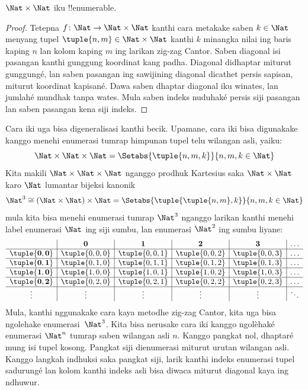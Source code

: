 \documentclass[../../../include/open-logic-section]{subfiles}
\begin{document}
\begin{prop}
$\Nat \times \Nat$ iku !!{enumerable}.
\end{prop}

\begin{proof}
Tetepna $f \colon \Nat \to \Nat\times\Nat$ kanthi cara metakake saben $k \in \Nat$
menyang tupel $\tuple{n,m} \in \Nat \times \Nat$ kanthi $k$ minangka nilai
ing baris kaping $n$ lan kolom kaping $m$ ing larikan zig-zag Cantor.
Saben diagonal isi pasangan kanthi gunggung koordinat kang padha.
Diagonal didhaptar miturut gunggungé, lan saben pasangan ing sawijining
diagonal dicathet persis sapisan, miturut koordinat kapisané.
Dawa saben dhaptar diagonal iku winates, lan jumlahé mundhak tanpa wates. Mula saben indeks
nuduhaké persis siji pasangan lan saben pasangan kena siji indeks.
\end{proof}

\begin{explain}
Cara iki uga bisa digeneralisasi kanthi becik. Upamane, cara iki bisa
digunakake kanggo menehi enumerasi tumrap himpunan tupel telu wilangan asli, yaiku:
\[
\Nat \times \Nat \times \Nat = \Setabs{\tuple{n,m,k}}{n,m,k \in \Nat}
\]
Kita makili $\Nat \times \Nat \times \Nat$ nganggo prodhuk
Kartesius saka $\Nat \times \Nat$ karo $\Nat$ lumantar bijeksi kanonik
\[
\Nat^3 \cong (\Nat \times \Nat) \times \Nat =
\Setabs{\tuple{\tuple{n,m},k}}{n, m, k
  \in \Nat }
\]
mula kita bisa menehi enumerasi tumrap $\Nat^3$ nganggo larikan kanthi menehi label
enumerasi $\Nat$ ing siji sumbu, lan enumerasi
$\Nat^2$ ing sumbu liyane:
\[
\begin{array}{ c | c | c | c | c | c}
& \mathbf 0 & \mathbf 1 & \mathbf 2 & \mathbf 3 & \dots \\
\hline
\mathbf{\tuple{0,0}} & \tuple{0,0,0} & \tuple{0,0,1} & \tuple{0,0,2} & \tuple{0,0,3} & \dots \\
\hline
\mathbf{\tuple{0,1}} & \tuple{0,1,0} & \tuple{0,1,1} & \tuple{0,1,2} & \tuple{0,1,3} & \dots \\
\hline
\mathbf{\tuple{1,0}} & \tuple{1,0,0} & \tuple{1,0,1} & \tuple{1,0,2} & \tuple{1,0,3} & \dots \\
\hline
\mathbf{\tuple{0,2}} & \tuple{0,2,0} & \tuple{0,2,1} & \tuple{0,2,2} & \tuple{0,2,3} & \dots\\
\hline
\vdots & \vdots & \vdots & \vdots & \vdots & \ddots \\
\end{array}
\]
Mula, kanthi nggunakake cara kaya metodhe zig-zag Cantor, kita uga bisa
ngolehake enumerasi~$\Nat^3$. Kita bisa nerusake cara iki kanggo
ngolèhaké enumerasi $\Nat^n$ tumrap saben wilangan asli $n$.
Kanggo pangkat nol, dhaptaré mung isi tupel kosong. Pangkat siji
dienumerasi miturut urutan wilangan asli. Kanggo langkah indhuksi
saka pangkat siji, larik kanthi indeks enumerasi tupel sadurungé lan kolom
kanthi indeks asli bisa diwaca miturut diagonal kaya ing ndhuwur.
\end{explain}
\end{document}
